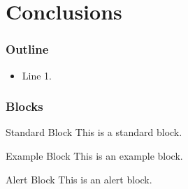 \documentclass[compress,11 pt,t]{beamer}
\begin{document}
\section{Conclusions}
\addtocounter{framenumber}{-1}
\frame{\vfill\tableofcontents[currentsection,
							  subsubsectionstyle=hide,
							  sectionstyle=show/shaded, 
							  subsectionstyle=show/show/hide]
}




\begin{frame}
\frametitle{Outline}

\begin{itemize}
    \item Line 1.
\end{itemize}


\end{frame}


\begin{frame}
\frametitle{Blocks}

\begin{block}{Standard Block}
    This is a standard block.
\end{block}

\begin{exampleblock}{Example Block}
    This is an example block.
\end{exampleblock}

\begin{alertblock}{Alert Block}
    This is an alert block.
\end{alertblock}



\end{frame}
\end{document}
